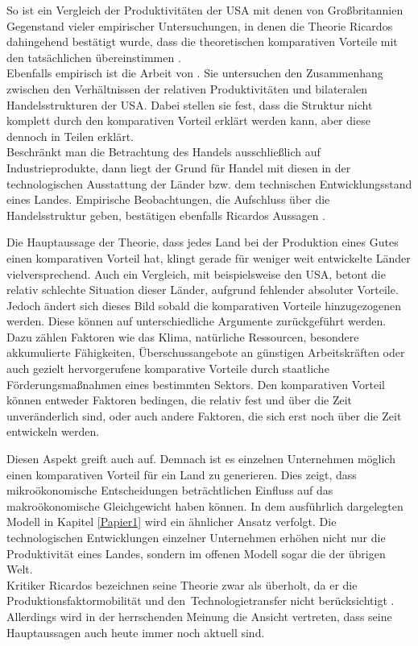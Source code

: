 So ist ein Vergleich der Produktivit{\"a}ten der USA mit denen von Gro{\ss}britannien Gegenstand vieler empirischer Untersuchungen, in denen die Theorie Ricardos dahingehend best{\"a}tigt wurde, dass die theoretischen komparativen Vorteile mit den tats{\"a}chlichen {\"u}bereinstimmen \citep{MacDougall.1951,MacDougall.1952,Stern.1962,Balassa.1963}.\\
Ebenfalls empirisch ist die Arbeit von \citet{Golub.2000}. Sie untersuchen den Zusammenhang zwischen den Verh{\"a}ltnissen der relativen Produktivit{\"a}ten und bilateralen Handelsstrukturen der USA. Dabei stellen sie fest, dass die Struktur nicht komplett durch den komparativen Vorteil erkl{\"a}rt werden kann, aber diese dennoch in Teilen erklärt.\\
Beschr{\"a}nkt man die Betrachtung des Handels ausschlie{\ss}lich auf Industrieprodukte, dann liegt der Grund f{\"u}r Handel mit diesen in der technologischen Ausstattung der L{\"a}nder bzw. dem technischen Entwicklungsstand eines Landes. Empirische Beobachtungen, die Aufschluss {\"u}ber die Handelsstruktur geben, bestätigen ebenfalls Ricardos Aussagen \citet{Dosi.1988}.\newline


Die Hauptaussage der Theorie, dass jedes Land bei der Produktion eines Gutes einen komparativen Vorteil hat, klingt gerade f{\"u}r weniger weit entwickelte L{\"a}nder vielversprechend. Auch ein Vergleich, mit beispielsweise den USA, betont die relativ schlechte Situation dieser L{\"a}nder, aufgrund fehlender absoluter Vorteile. Jedoch ändert sich dieses Bild sobald die komparativen Vorteile hinzugezogenen werden. Diese können auf unterschiedliche Argumente zur{\"u}ckgef{\"u}hrt werden. Dazu z{\"a}hlen Faktoren wie das Klima, nat{\"u}rliche Ressourcen, besondere akkumulierte F{\"a}higkeiten, {\"U}berschussangebote an g{\"u}nstigen Arbeitskr{\"a}ften oder auch gezielt hervorgerufene komparative Vorteile durch staatliche F{\"o}rderungsma{\ss}nahmen eines bestimmten Sektors. Den komparativen Vorteil k{\"o}nnen entweder Faktoren bedingen, die relativ fest und {\"u}ber die Zeit unver{\"a}nderlich sind, oder auch andere Faktoren, die sich erst noch {\"u}ber die Zeit entwickeln werden.\newline 


Diesen Aspekt greift auch \citet{Helpman.2011} auf. Demnach ist es einzelnen Unternehmen m{\"o}glich einen komparativen Vorteil f{\"u}r ein Land zu generieren. Dies zeigt, dass mikro{\"o}konomische Entscheidungen betr{\"a}chtlichen Einfluss auf das makro{\"o}konomische Gleichgewicht haben k{\"o}nnen. In dem ausf{\"u}hrlich dargelegten Modell in Kapitel \ref{Papier1} wird ein {\"a}hnlicher Ansatz verfolgt. Die technologischen Entwicklungen einzelner Unternehmen erh{\"o}hen nicht nur die Produktivit{\"a}t eines Landes, sondern im offenen Modell sogar die der {\"u}brigen Welt.\\
Kritiker Ricardos bezeichnen seine Theorie zwar als {\"u}berholt, da er die Produktionsfaktormobilit{\"a}t und den~Technologietransfer nicht ber{\"u}cksichtigt \citep{Irwin.2009}. Allerdings wird in der herrschenden Meinung die Ansicht vertreten, dass seine Hauptaussagen auch heute immer noch aktuell sind.


